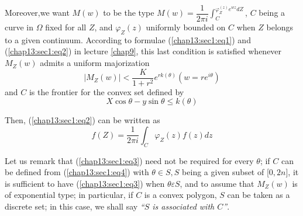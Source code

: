 Moreover,\pageoriginale we want $M (w)$ to be the type $M (w) = \dfrac{1}{ 2\pi i}
\int_C^{\varphi_Z^{(z)} e^{wz}{dZ}}$, $C$ being a curve in
$\Omega$ fixed for all $Z$, and $\varphi_Z(z)$ uniformly bounded on
$C$ when $Z$ belongs to a given continuum. According to formulae
(\ref{chap13:sec1:eq1}) 
and (\ref{chap13:sec1:eq2}) in lecture \ref{chap9}, this last
condition is satisfied whenever $M_{Z}(w)$ admits a uniform majorization 
\begin{equation}
 |M_Z (w)| < \frac{K}{1+r^2} e^{rk(\theta)} (w = r e^{i \theta})
 \tag{3}\label{chap13:sec1:eq3} 
\end{equation}
and $C$ is the frontier for the convex set defined by 
\begin{equation}
 X \cos \theta - y \sin \theta \leq k (\theta) \tag{4}\label{chap13:sec1:eq4}
\end{equation}

Then, (\ref{chap13:sec1:eq2}) can be written as 
\begin{equation}
 f (Z) = \frac{1}{2 \pi i } \int_C \varphi_Z (z) f (z) dz
 \tag{5}\label{chap13:sec1:eq5} 
\end{equation}

Let us remark that (\ref{chap13:sec1:eq3}) need not be required for every $\theta$; if
$C$ can be defined from (\ref{chap13:sec1:eq4}) with $ \theta \in S, S$ being a
given subset of [$0,2n$], it is sufficient to have
(\ref{chap13:sec1:eq3}) when $ \theta 
\varepsilon S$, and to assume that $M_Z(w)$ is of exponential type; in
particular, if $C$ is a convex polygon, $S$ can be taken as a
discrete set; in this case, we shall say \textit{``$S $ is
 associated with $C$''}. 

